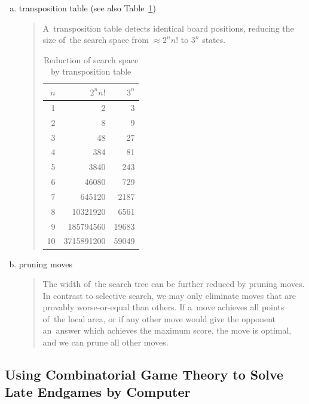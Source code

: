 \begin{enumerate}[(a)]
  \item transposition table (see also Table~\ref{tab:reduction-transp-tab})
    \begin{quotation}
      A~transposition table detects identical board positions, reducing the size of~the search space from $\approx 2^n n!$ to $3^n$ states.

      \begin{table}[!htbp]
        \centering
        \begin{tabular}{ |rrr| }
          \hline
          \textbf{$n$} & \textbf{$2^nn!$} & \textbf{$3^n$} \\
          \hline
          1	&	2	&	3 \\ 
          2	&	8	&	9 \\ 
          3	&	48	&	27 \\ 
          4	&	384	&	81 \\ 
          5	&	3840	&	243 \\ 
          6	&	46080	&	729 \\ 
          7	&	645120	&	2187 \\ 
          8	&	10321920	&	6561 \\ 
          9	&	185794560	&	19683 \\ 
          10	&	3715891200	&	59049 \\ 
          \hline
        \end{tabular}
        \caption{Reduction of search space by transposition table}
        \label{tab:reduction-transp-tab}
      \end{table}
    \end{quotation}

  \item pruning moves
    \begin{quotation}
      The width of~the search tree can be further reduced by pruning moves.
      In contrast to selective search, we may only eliminate moves that are provably worse-or-equal than others.
      If a~move achieves all points of~the local area, or if any other move would give the opponent an~answer which achieves the maximum score, the move is optimal, and we can prune all other moves.
    \end{quotation}
\end{enumerate}

\subsection{Using Combinatorial Game Theory to Solve Late Endgames by Computer}

